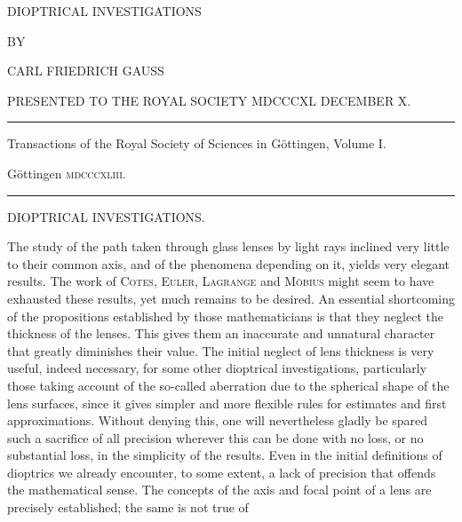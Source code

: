 \clearpage
\thispagestyle{empty}
\begin{center}
\vspace*{0.6in}
{\Large DIOPTRICAL INVESTIGATIONS\par}
\vspace{0.6in}
BY\par
\vspace{0.5in}
{\large CARL FRIEDRICH GAUSS\par}
\vspace{0.4in}
PRESENTED TO THE ROYAL SOCIETY MDCCCXL DECEMBER X.\par
\vfill
\rule{0.85\textwidth}{0.3pt}\par
Transactions of the Royal Society of Sciences in Göttingen, Volume I.\par
Göttingen \textsc{mdcccxliii}.\par
\rule{0.85\textwidth}{0.3pt}
\end{center}
\clearpage
{}
\renewcommand{\Article}[1]{\par\medskip\Needspace{4\baselineskip}\pdfbookmark[1]{Art. #1}{dioptrische-art-#1}\centerline{\textbf{#1.}}\nobreak\smallskip}
\begin{center}
DIOPTRICAL INVESTIGATIONS.
\end{center}
\medskip
The study of the path taken through glass lenses by light rays inclined very little to their common axis, and of the phenomena depending on it, yields very elegant results. The work of \textsc{Cotes}, \textsc{Euler}, \textsc{Lagrange} and \textsc{Möbius} might seem to have exhausted these results, yet much remains to be desired. An essential shortcoming of the propositions established by those mathematicians is that they neglect the thickness of the lenses. This gives them an inaccurate and unnatural character that greatly diminishes their value. The initial neglect of lens thickness is very useful, indeed necessary, for some other dioptrical investigations, particularly those taking account of the so-called aberration due to the spherical shape of the lens surfaces, since it gives simpler and more flexible rules for estimates and first approximations. Without denying this, one will nevertheless gladly be spared such a sacrifice of all precision wherever this can be done with no loss, or no substantial loss, in the simplicity of the results. Even in the initial definitions of dioptrics we already encounter, to some extent, a lack of precision that offends the mathematical sense. The concepts of the axis and focal point of a lens are precisely established; the same is not true of

